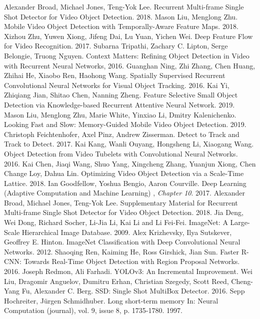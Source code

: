 \documentclass[conference]{IEEEtran}
\begin{document}
\begin{thebibliography}{00}
 Alexander Broad, Michael Jones, Teng-Yok Lee. Recurrent Multi-frame Single Shot Detector for Video Object Detection. 2018.
 Mason Liu, Menglong Zhu. Mobile Video Object Detection with Temporally-Aware Feature Maps. 2018.
 Xizhou Zhu, Yuwen Xiong, Jifeng Dai, Lu Yuan, Yichen Wei. Deep Feature Flow for Video Recognition. 2017.
 Subarna Tripathi, Zachary C. Lipton, Serge Belongie, Truong Nguyen. Context Matters: Refining Object Detection in Video with Recurrent Neural Networks, 2016.
 Guanghan Ning, Zhi Zhang, Chen Huang, Zhihai He, Xiaobo Ren, Haohong Wang. Spatially Supervised Recurrent Convolutional Neural Networks for Visual Object Tracking. 2016.
 Kai Yi, Zhiqiang Jian, Shitao Chen, Nanning Zheng. Feature Selective Small Object Detection via Knowledge-based Recurrent Attentive Neural Network. 2019.
 Mason Liu, Menglong Zhu, Marie White, Yinxiao Li, Dmitry Kalenichenko. Looking Fast and Slow: Memory-Guided Mobile Video Object Detection. 2019.
 Christoph Feichtenhofer, Axel Pinz, Andrew Zisserman. Detect to Track and Track to Detect. 2017.
 Kai Kang, Wanli Ouyang, Hongsheng Li, Xiaogang Wang. Object Detection from Video Tubelets with Convolutional Neural Networks. 2016.
 Kai Chen, Jiaqi Wang, Shuo Yang, Xingcheng Zhang, Yuanjun Xiong, Chen Change Loy, Dahua Lin. Optimizing Video Object Detection via a Scale-Time Lattice. 2018.
 Ian Goodfellow, Yoshua Bengio, Aaron Courville. Deep Learning (Adaptive Computation and Machine Learning) , \textit{Chapter 10}. 2017.
 Alexander Broad, Michael Jones, Teng-Yok Lee. Supplementary Material for Recurrent Multi-frame Single Shot Detector for Video Object Detection. 2018.
 Jia Deng, Wei Dong, Richard Socher, Li-Jia Li, Kai Li and Li Fei-Fei. ImageNet: A Large-Scale Hierarchical Image Database. 2009.
 Alex Krizhevsky, Ilya Sutskever, Geoffrey E. Hinton. ImageNet Classification with Deep Convolutional Neural Networks. 2012.
 Shaoqing Ren, Kaiming He, Ross Girshick, Jian Sun. Faster R-CNN: Towards Real-Time Object Detection with Region Proposal Networks. 2016. 
 Joseph Redmon, Ali Farhadi. YOLOv3: An Incremental Improvement.
 Wei Liu, Dragomir Anguelov, Dumitru Erhan, Christian Szegedy, Scott Reed, Cheng-Yang Fu, Alexander C. Berg. SSD: Single Shot MultiBox Detector. 2016.
 Sepp Hochreiter, Jürgen Schmidhuber. Long short-term memory In: Neural Computation (journal), vol. 9, issue 8, p. 1735-1780. 1997.

\end{thebibliography}
\end{document}
